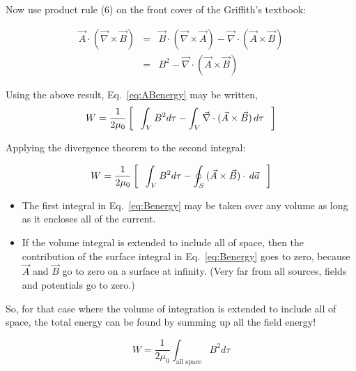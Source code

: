\documentclass[12pt]{article}
\begin{document}
\begin{flushleft}
Now use product rule (6) on the front cover of the Griffith's textbook:

\begin{eqnarray*}
\vec{A} \cdot (\vec{\nabla} \times \vec{B}) & = & \vec{B} \cdot (\vec{\nabla} \times \vec{A}) - \vec{\nabla} \cdot (\vec{A} \times \vec{B}) \\
& = & B^{2}-\vec{\nabla} \cdot (\vec{A} \times \vec{B})
\end{eqnarray*}

Using the above result, Eq.~\ref{eq:ABenergy} may be written,
\begin{equation*}
W =\frac{1}{2\mu_{0}} \left[ \hspace{.1in} \int_{V} B^{2} d\tau - \int_{V} \vec{\nabla} \cdot (\vec{A} \times \vec{B} ) \, d\tau \hspace{.1in} \right]
\end{equation*}

Applying the divergence theorem to the second integral:

\begin{equation}
W =\frac{1}{2\mu_{0}} \left[ \hspace{.1in} \int_{V} B^{2} d\tau - \oint_{S} \, (\vec{A} \times \vec{B} ) \cdot \, d\vec{a} \hspace{.1in} \right]
\label{eq:Benergy}
\end{equation}

\begin{itemize}
\item The first integral in Eq.~\ref{eq:Benergy} may be taken over any volume as long as it encloses all of the current.
\item If the volume integral is extended to include all of space, then the contribution of the surface integral in Eq.~\ref{eq:Benergy} goes to zero, because $\vec{A}$ and $\vec{B}$ go to zero on a surface at infinity.  (Very far from all sources, fields and potentials go to zero.)
\end{itemize}

So, for that case where the volume of integration is extended to include all of space, the total energy can be found by summing up all the field energy!

\begin{equation*}
W =\frac{1}{2\mu_{0}} \int_{\text{all space}} B^{2} d\tau 
\end{equation*}

\end{flushleft}
\end{document}
